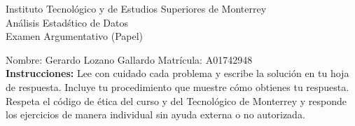 \documentclass[10pt]{report}
\begin{document}
\newpage



\begin{center}
{\large Instituto Tecnol\'{o}gico y de Estudios Superiores de Monterrey \\
An\'alisis Estad\'stico de Datos } \\
Examen Argumentativo (Papel)
\end{center}

Nombre: \underline{\hspace*{.2in}}
Gerardo Lozano Gallardo
\underline{\hspace*{.2in}} \quad Matr\'icula:\underline{\hspace*{.2in}}
A01742948
\underline{\hspace*{.2in}} \\

{\bf Instrucciones:} Lee con cuidado cada problema y escribe la soluci\'on
en tu hoja de respuesta. Incluye tu procedimiento que muestre c\'omo obtienes tu respuesta.  Respeta el c\'odigo de \'etica del curso y del Tecnol\'ogico de Monterrey y responde los ejercicios de manera individual sin ayuda externa o no autorizada.
\end{document}
